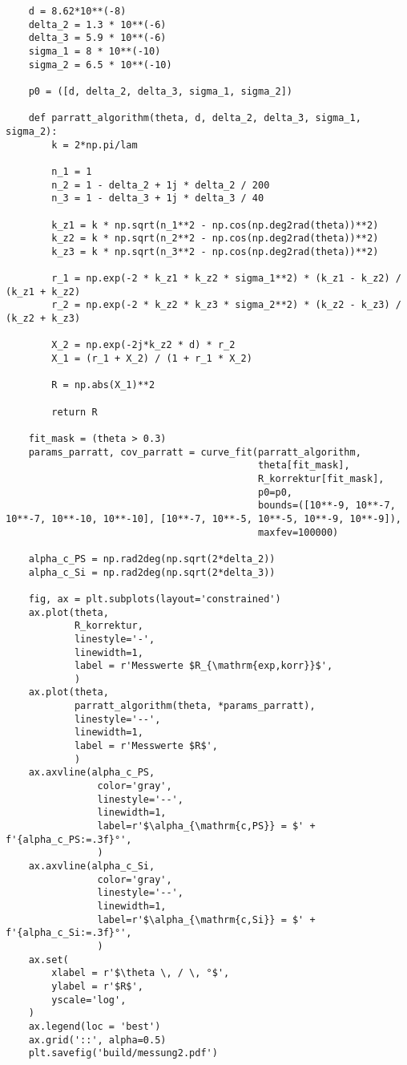 \begin{lstlisting}
    d = 8.62*10**(-8)
    delta_2 = 1.3 * 10**(-6)
    delta_3 = 5.9 * 10**(-6)
    sigma_1 = 8 * 10**(-10)
    sigma_2 = 6.5 * 10**(-10)
    
    p0 = ([d, delta_2, delta_3, sigma_1, sigma_2])
    
    def parratt_algorithm(theta, d, delta_2, delta_3, sigma_1, sigma_2):
        k = 2*np.pi/lam
    
        n_1 = 1
        n_2 = 1 - delta_2 + 1j * delta_2 / 200
        n_3 = 1 - delta_3 + 1j * delta_3 / 40
        
        k_z1 = k * np.sqrt(n_1**2 - np.cos(np.deg2rad(theta))**2)
        k_z2 = k * np.sqrt(n_2**2 - np.cos(np.deg2rad(theta))**2)
        k_z3 = k * np.sqrt(n_3**2 - np.cos(np.deg2rad(theta))**2)
    
        r_1 = np.exp(-2 * k_z1 * k_z2 * sigma_1**2) * (k_z1 - k_z2) / (k_z1 + k_z2)
        r_2 = np.exp(-2 * k_z2 * k_z3 * sigma_2**2) * (k_z2 - k_z3) / (k_z2 + k_z3)
    
        X_2 = np.exp(-2j*k_z2 * d) * r_2
        X_1 = (r_1 + X_2) / (1 + r_1 * X_2)
    
        R = np.abs(X_1)**2
    
        return R
    
    fit_mask = (theta > 0.3)
    params_parratt, cov_parratt = curve_fit(parratt_algorithm,
                                            theta[fit_mask],
                                            R_korrektur[fit_mask],
                                            p0=p0,
                                            bounds=([10**-9, 10**-7, 10**-7, 10**-10, 10**-10], [10**-7, 10**-5, 10**-5, 10**-9, 10**-9]),
                                            maxfev=100000)
    
    alpha_c_PS = np.rad2deg(np.sqrt(2*delta_2))
    alpha_c_Si = np.rad2deg(np.sqrt(2*delta_3))
    
    fig, ax = plt.subplots(layout='constrained')
    ax.plot(theta,
            R_korrektur,
            linestyle='-',
            linewidth=1,
            label = r'Messwerte $R_{\mathrm{exp,korr}}$',
            )
    ax.plot(theta,
            parratt_algorithm(theta, *params_parratt),
            linestyle='--',
            linewidth=1,
            label = r'Messwerte $R$',
            )
    ax.axvline(alpha_c_PS,
                color='gray',
                linestyle='--',
                linewidth=1,
                label=r'$\alpha_{\mathrm{c,PS}} = $' + f'{alpha_c_PS:=.3f}°',
                )
    ax.axvline(alpha_c_Si,
                color='gray',
                linestyle='--',
                linewidth=1,
                label=r'$\alpha_{\mathrm{c,Si}} = $' + f'{alpha_c_Si:=.3f}°',
                )
    ax.set(
        xlabel = r'$\theta \, / \, °$',
        ylabel = r'$R$',
        yscale='log',
    )
    ax.legend(loc = 'best')
    ax.grid('::', alpha=0.5)
    plt.savefig('build/messung2.pdf')
\end{lstlisting}